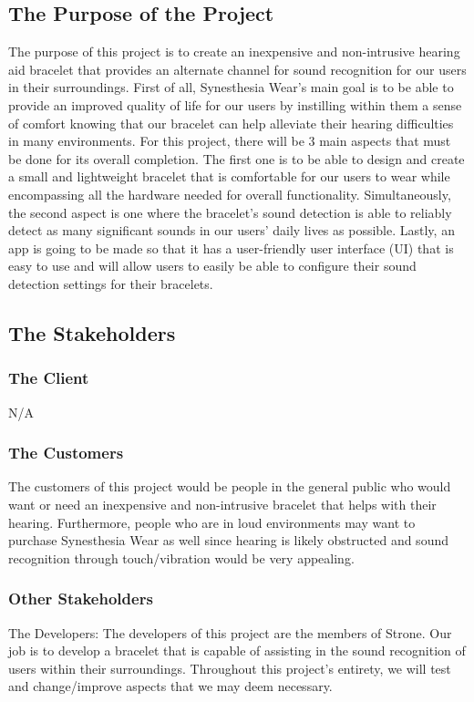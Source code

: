 \documentclass[12pt]{article}
\begin{document}
\subsection{The Purpose of the Project}
The purpose of this project is to create an inexpensive and non-intrusive hearing aid 
bracelet that provides an alternate channel for sound recognition for our users in their 
surroundings. First of all, Synesthesia Wear's main goal is to be able to provide an 
improved quality of life for our users by instilling within them a sense of comfort 
knowing that our bracelet can help alleviate their hearing difficulties in many environments. 
For this project, there will be 3 main aspects that must be done for its overall completion. 
The first one is to be able to design and create a small and lightweight bracelet that 
is comfortable for our users to wear while encompassing all the hardware needed for 
overall functionality. Simultaneously, the second aspect is one where the bracelet's 
sound detection is able to reliably detect as many significant sounds in our users' daily 
lives as possible. Lastly, an app is going to be made so that it has a user-friendly user interface (UI) that is easy to use and will allow users to easily be able to configure their sound 
detection settings for their bracelets.

\subsection{The Stakeholders}

\subsubsection{The Client}
N/A

\subsubsection{The Customers}
The customers of this project would be people in the general public who would want or 
need an inexpensive and non-intrusive bracelet that helps with their hearing. Furthermore, 
people who are in loud environments may want to purchase Synesthesia Wear as well since 
hearing is likely obstructed and sound recognition through touch/vibration would be very 
appealing.

\subsubsection{Other Stakeholders}
The Developers:
The developers of this project are the members of Strone. Our job is to develop a 
bracelet that is capable of assisting in the sound recognition of users within their 
surroundings. Throughout this project's entirety, we will test and change/improve 
aspects that we may deem necessary.
\end{document}
